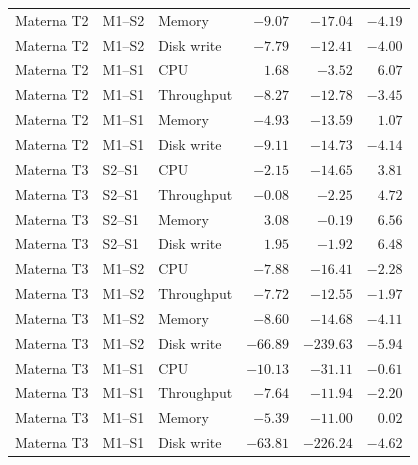 \begin{longtable}{@{}lllrrr@{}}
  Materna T2 & M1--S2 & Memory & $-9.07$ & $-17.04$ & $-4.19$ \\
  Materna T2 & M1--S2 & Disk write & $-7.79$ & $-12.41$ & $-4.00$ \\
  Materna T2 & M1--S1 & CPU & $ 1.68$ & $-3.52$ & $ 6.07$ \\
  Materna T2 & M1--S1 & Throughput & $-8.27$ & $-12.78$ & $-3.45$ \\
  Materna T2 & M1--S1 & Memory & $-4.93$ & $-13.59$ & $ 1.07$ \\
  Materna T2 & M1--S1 & Disk write & $-9.11$ & $-14.73$ & $-4.14$ \\
  Materna T3 & S2--S1 & CPU & $-2.15$ & $-14.65$ & $ 3.81$ \\
  Materna T3 & S2--S1 & Throughput & $-0.08$ & $-2.25$ & $ 4.72$ \\
  Materna T3 & S2--S1 & Memory & $ 3.08$ & $-0.19$ & $ 6.56$ \\
  Materna T3 & S2--S1 & Disk write & $ 1.95$ & $-1.92$ & $ 6.48$ \\
  Materna T3 & M1--S2 & CPU & $-7.88$ & $-16.41$ & $-2.28$ \\
  Materna T3 & M1--S2 & Throughput & $-7.72$ & $-12.55$ & $-1.97$ \\
  Materna T3 & M1--S2 & Memory & $-8.60$ & $-14.68$ & $-4.11$ \\
  Materna T3 & M1--S2 & Disk write & $-66.89$ & $-239.63$ & $-5.94$ \\
  Materna T3 & M1--S1 & CPU & $-10.13$ & $-31.11$ & $-0.61$ \\
  Materna T3 & M1--S1 & Throughput & $-7.64$ & $-11.94$ & $-2.20$ \\
  Materna T3 & M1--S1 & Memory & $-5.39$ & $-11.00$ & $ 0.02$ \\
  Materna T3 & M1--S1 & Disk write & $-63.81$ & $-226.24$ & $-4.62$ \\
\end{longtable}
